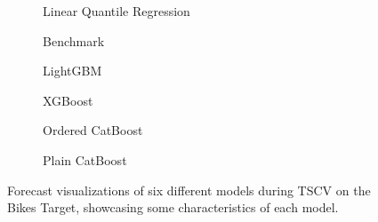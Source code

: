 \begin{figure}[htbp]
    \centering
    \begin{subfigure}[b]{0.5\textwidth}
        \centering
        
        \caption{Linear Quantile Regression}
        \label{fig:small-orfe}
    \end{subfigure}%
    \begin{subfigure}[b]{0.5\textwidth}
        \centering
        
        \caption{Benchmark}
        \label{fig:armed-play}
    \end{subfigure}

    \begin{subfigure}[b]{0.5\textwidth}
        \centering
        
        \caption{LightGBM}
        \label{fig:mangy-flux}
    \end{subfigure}%
    \begin{subfigure}[b]{0.5\textwidth}
        \centering
        
        \caption{XGBoost}
        \label{fig:couth-ruby}
    \end{subfigure}
    \begin{subfigure}[b]{0.5\textwidth}
        \centering
        
        \caption{Ordered CatBoost}
        \label{fig:civil-leas}
    \end{subfigure}%
    \begin{subfigure}[b]{0.5\textwidth}
        \centering
        
        \caption{Plain CatBoost}
        \label{fig:blear-dita}
    \end{subfigure}%
    
    \caption{Forecast visualizations of six different models during TSCV on the Bikes Target, showcasing some characteristics of each model.}
    \label{fig:bikes_forecast}
\end{figure}

